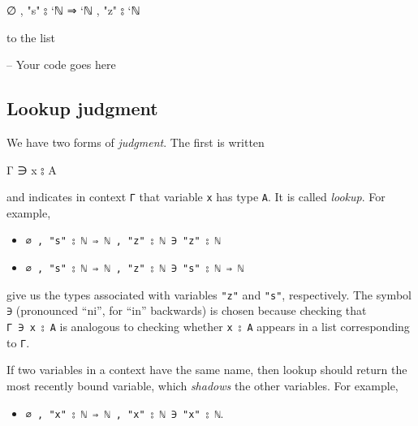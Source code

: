 \begin{myDisplay}
∅ , "s" ⦂ `ℕ ⇒ `ℕ , "z" ⦂ `ℕ
\end{myDisplay}

to the list

\begin{myDisplay}
[ ⟨ "z" , `ℕ ⟩ , ⟨ "s" , `ℕ ⇒ `ℕ ⟩ ]
\end{myDisplay}

\begin{fence}
\begin{code}
-- Your code goes here
\end{code}
\end{fence}

\hypertarget{lookup-judgment}{%
\subsection{Lookup judgment}\label{lookup-judgment}}

We have two forms of \emph{judgment}. The first is written

\begin{myDisplay}
Γ ∋ x ⦂ A
\end{myDisplay}

and indicates in context \texttt{Γ} that variable \texttt{x} has type
\texttt{A}. It is called \emph{lookup}. For example,

\begin{itemize}
\tightlist
\item
  \texttt{∅\ ,\ "s"\ ⦂\ \textasciigrave{}ℕ\ ⇒\ \textasciigrave{}ℕ\ ,\ "z"\ ⦂\ \textasciigrave{}ℕ\ ∋\ "z"\ ⦂\ \textasciigrave{}ℕ}
\item
  \texttt{∅\ ,\ "s"\ ⦂\ \textasciigrave{}ℕ\ ⇒\ \textasciigrave{}ℕ\ ,\ "z"\ ⦂\ \textasciigrave{}ℕ\ ∋\ "s"\ ⦂\ \textasciigrave{}ℕ\ ⇒\ \textasciigrave{}ℕ}
\end{itemize}

give us the types associated with variables \texttt{"z"} and
\texttt{"s"}, respectively. The symbol \texttt{∋} (pronounced ``ni'',
for ``in'' backwards) is chosen because checking that
\texttt{Γ\ ∋\ x\ ⦂\ A} is analogous to checking whether \texttt{x\ ⦂\ A}
appears in a list corresponding to \texttt{Γ}.

If two variables in a context have the same name, then lookup should
return the most recently bound variable, which \emph{shadows} the other
variables. For example,

\begin{itemize}
\tightlist
\item
  \texttt{∅\ ,\ "x"\ ⦂\ \textasciigrave{}ℕ\ ⇒\ \textasciigrave{}ℕ\ ,\ "x"\ ⦂\ \textasciigrave{}ℕ\ ∋\ "x"\ ⦂\ \textasciigrave{}ℕ}.
\end{itemize}

